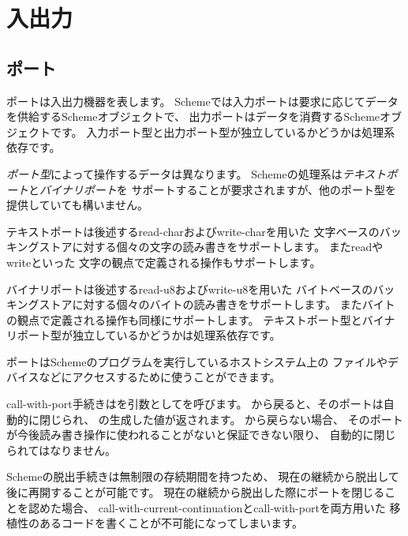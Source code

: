 \section{入出力}

\subsection{ポート}
\label{portsection}

ポートは入出力機器を表します。
Schemeでは入力ポートは要求に応じてデータを供給するSchemeオブジェクトで、
出力ポートはデータを消費するSchemeオブジェクトです。
入力ポート型と出力ポート型が独立しているかどうかは処理系依存です。

{\em ポート型}によって操作するデータは異なります。
Schemeの処理系は{\em テキストポート}と{\em バイナリポート}を
サポートすることが要求されますが、他のポート型を提供していても構いません。

テキストポートは後述する{\cf read-char}および{\cf write-char}を用いた
文字ベースのバッキングストアに対する個々の文字の読み書きをサポートします。
また{\cf read}や{\cf write}といった
文字の観点で定義される操作もサポートします。

バイナリポートは後述する{\cf read-u8}および{\cf write-u8}を用いた
バイトベースのバッキングストアに対する個々のバイトの読み書きをサポートします。
またバイトの観点で定義される操作も同様にサポートします。
テキストポート型とバイナリポート型が独立しているかどうかは処理系依存です。

ポートはSchemeのプログラムを実行しているホストシステム上の
ファイルやデバイスなどにアクセスするために使うことができます。

\begin{entry}{%
}

{\cf call-with-port}手続きはを引数としてを呼びます。
から戻ると、そのポートは自動的に閉じられ、
の生成した値が返されます。
から戻らない場合、
そのポートが今後読み書き操作に使われることがないと保証できない限り、
自動的に閉じられてはなりません。

\begin{rationale}
Schemeの脱出手続きは無制限の存続期間を持つため、
現在の継続から脱出して後に再開することが可能です。
現在の継続から脱出した際にポートを閉じることを認めた場合、
{\cf call-\+with-\+current-\+continuation}と{\cf call-\+with-\+port}を両方用いた
移植性のあるコードを書くことが不可能になってしまいます。
\end{rationale} 

\end{entry}

